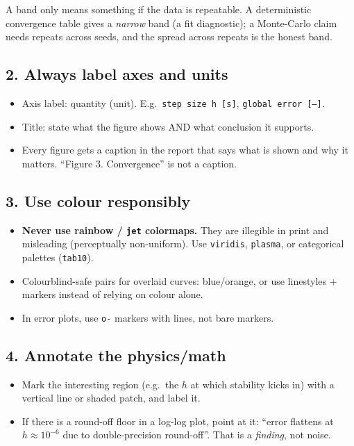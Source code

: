 \documentclass[11pt]{article}
\begin{document}
A band only means something if the data is repeatable. A deterministic
convergence table gives a \emph{narrow} band (a fit diagnostic); a Monte-Carlo
claim needs repeats across seeds, and the spread across repeats is the honest
band.

\subsection*{2. Always label axes and units}
\begin{itemize}[leftmargin=2em, itemsep=1pt]
  \item Axis label: quantity (unit). E.g.\ \texttt{step size h [s]},
    \texttt{global error [---]}.
  \item Title: state what the figure shows AND what conclusion it supports.
  \item Every figure gets a caption in the report that says what is shown and
    why it matters. ``Figure 3. Convergence'' is not a caption.
\end{itemize}

\subsection*{3. Use colour responsibly}
\begin{itemize}[leftmargin=2em, itemsep=1pt]
  \item \textbf{Never use rainbow / \texttt{jet} colormaps.} They are illegible in
    print and misleading (perceptually non-uniform). Use \texttt{viridis},
    \texttt{plasma}, or categorical palettes (\texttt{tab10}).
  \item Colourblind-safe pairs for overlaid curves: blue/orange, or use
    linestyles + markers instead of relying on colour alone.
  \item In error plots, use \texttt{o-} markers with lines, not bare markers.
\end{itemize}

\subsection*{4. Annotate the physics/math}
\begin{itemize}[leftmargin=2em, itemsep=1pt]
  \item Mark the interesting region (e.g.\ the $h$ at which stability kicks in)
    with a vertical line or shaded patch, and label it.
  \item If there is a round-off floor in a log-log plot, point at it: ``error
    flattens at $h \approx 10^{-6}$ due to double-precision round-off''. That is
    a \emph{finding}, not noise.
\end{itemize}
\end{document}
